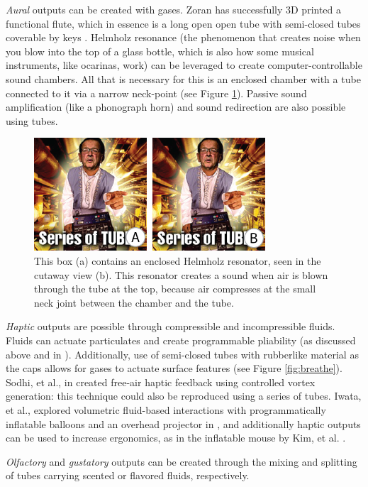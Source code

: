 \emph{Aural} outputs can be created with gases.  Zoran has successfully 3D printed a functional flute, which in essence is a long open open tube with semi-closed tubes coverable by keys \cite{Zoran-flute}.  Helmholz resonance (the phenomenon that creates noise when you blow into the top of a glass bottle, which is also how some musical instruments, like ocarinas, work) can be leveraged to create computer-controllable sound chambers.  All that is necessary for this is an enclosed chamber with a tube connected to it via a narrow neck-point (see Figure \ref{fig:ocarina}).  Passive sound amplification (like a phonograph horn) and sound redirection are also possible using tubes.

\begin{figure}[h]
\centering
    \includegraphics[width=3.4in]{figures/helmholz.png}
\caption{This box (a) contains an enclosed Helmholz resonator, seen in the cutaway view (b).  This resonator creates a sound when air is blown through the tube at the top, because air compresses at the small neck joint between the chamber and the tube.  }
\label{fig:ocarina}
\end{figure}

\emph{Haptic} outputs are possible through compressible and incompressible fluids.  Fluids can actuate particulates and create programmable pliability (as discussed above and in \cite{Follmer-jamming}).  Additionally, use of semi-closed tubes with rubberlike material as the caps allows for gases to actuate surface features (see Figure \ref{fig:breathe}).  Sodhi, et al., in \cite{Sodhi-aireal} created free-air haptic feedback using controlled vortex generation: this technique could also be reproduced using a series of tubes.  Iwata, et al., explored volumetric fluid-based interactions with programmatically inflatable balloons and an overhead projector in \cite{Iwata-volflex}, and additionally haptic outputs can be used to increase ergonomics, as in the inflatable mouse by Kim, et al. \cite{Kim-inflatablemouse}.

\emph{Olfactory} and \emph{gustatory} outputs can be created through the mixing and splitting of tubes carrying scented or flavored fluids, respectively.

